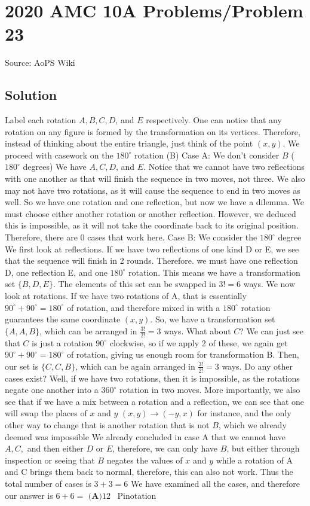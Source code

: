 \documentclass[12pt]{article}
\begin{document}
\section*{{2020 AMC 10A Problems/Problem 23}}
Source: AoPS Wiki

\subsection*{Solution}
Label each rotation \( A, B, C, D \), and \( E \) respectively. One can notice that any rotation on any figure is formed by the transformation on its vertices. Therefore, instead of thinking about the entire triangle, just think of the point \( (x, y) \). We proceed with casework on the \( 180^\circ \) rotation (B) Case A: We don't consider \( B \) (\( 180^\circ \) degrees) We have \( A, C, D \), and \( E \).
Notice that we cannot have two reflections with one another as that will finish the sequence in two moves, not three. We also may not have two rotations, as it will cause the sequence to end in two moves as well. So we have one rotation and one reflection, but now we have a dilemma. We must choose either another rotation or another reflection. However, we deduced this is impossible, as it will not take the coordinate back to its original position. Therefore, there are 0 cases that work here. Case B: We consider the \( 180^\circ \) degree We first look at reflections. If we have two reflections of one kind D or E, we see that the sequence will finish in 2 rounds. Therefore. we must have one reflection D, one reflection E, and one \( 180^\circ \) rotation. This means we have a transformation set \( \{B, D, E\} \). The elements of this set can be swapped in \( 3! = 6 \) ways. We now look at rotations. If we have two rotations of A, that is essentially \( 90^\circ + 90^\circ = 180^\circ \) of rotation, and therefore mixed in with a \( 180^\circ \) rotation guarantees the same coordinate \( (x, y) \). So, we have a transformation set \( \{A, A, B\} \), which can be arranged in \( \frac{3!}{2!} = 3 \) ways. What about \( C \)? We can just see that \( C \) is just a rotation \( 90^\circ \) clockwise, so if we apply 2 of these, we again get \( 90^\circ + 90^\circ = 180^\circ \) of rotation, giving us enough room for transformation B. Then, our set is \( \{C, C, B\} \), which can be again arranged in \( \frac{3!}{2!} = 3 \) ways. Do any other cases exist? Well, if we have two rotations, then it is impossible, as the rotations negate one another into a \( 360^\circ \) rotation in two moves.
More importantly, we also see that if we have a mix between a rotation and a reflection, we can see that one will swap the places of \( x \) and \( y \) \( (x, y) \rightarrow (-y, x) \) for instance, and the only other way to change that is another rotation that is not \( B \), which we already deemed was impossible
We already concluded in case A that we cannot have \( A, C, \) and then either \( D \) or \( E \), therefore, we can only have \( B \), but either through inspection or seeing that \( B \) negates the values of \( x \) and \( y \) while a rotation of A and C brings them back to normal, therefore, this can also not work. Thus the total number of cases is \( 3+3 = 6 \) We have examined all the cases, and therefore our answer is \( 6+6 = \) $\boxed{\textbf{(A)} 12}$ ~Pinotation
\end{document}
